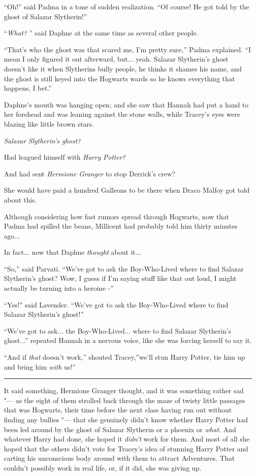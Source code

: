 ``Oh!'' said Padma in a tone of sudden realization. ``Of course! He got
told by the ghost of Salazar Slytherin!''

``\emph{What?} '' said Daphne at the same time as several other people.

``That's who the ghost was that scared me, I'm pretty sure,'' Padma
explained. ``I mean I only figured it out afterward, but... yeah.
Salazar Slytherin's ghost doesn't like it when Slytherins bully people,
he thinks it shames his name, and the ghost is still keyed into the
Hogwarts wards so he knows everything that happens, I bet.''

Daphne's mouth was hanging open; and she saw that Hannah had put a hand
to her forehead and was leaning against the stone walls, while Tracey's
eyes were blazing like little brown stars.

\emph{Salazar Slytherin's ghost?}

Had leagued himself with \emph{Harry Potter?}

And had sent \emph{Hermione Granger} to stop Derrick's crew?

She would have paid a hundred Galleons to be there when Draco Malfoy got
told about this.

Although considering how fast rumors spread through Hogwarts, now that
Padma had spilled the beans, Millicent had probably told him thirty
minutes ago...

In fact... now that Daphne \emph{thought} about it...

``So,'' said Parvati. ``We've got to ask the Boy-Who-Lived where to find
Salazar Slytherin's ghost? Wow, I guess if I'm saying stuff like that
out loud, I might actually be turning into a heroine -''

``Yes!'' said Lavender. ``We've got to ask the Boy-Who-Lived where to
find Salazar Slytherin's ghost!''

``We've got to ask... the Boy-Who-Lived... where to find
Salazar Slytherin's ghost...'' repeated Hannah in a nervous voice,
like she was forcing herself to say it.

``And if \emph{that} doesn't work,'' shouted Tracey,''we'll stun Harry
Potter, tie him up and bring him \emph{with} us!''

\begin{center}\rule{3in}{0.4pt}\end{center}

It said something, Hermione Granger thought, and it was something rather
sad "--- as the eight of them strolled back through the maze of twisty
little passages that was Hogwarts, their time before the next class
having run out without finding any bullies "--- that she genuinely didn't
know whether Harry Potter had been led around by the ghost of Salazar
Slytherin or a phoenix or \emph{what.} And whatever Harry had done, she
hoped it \emph{didn't} work for them. And most of all she hoped that the
others didn't vote for Tracey's idea of stunning Harry Potter and
carting his unconscious body around with them to attract Adventures.
That couldn't possibly work in real life, or, if it did, she was giving
up.

